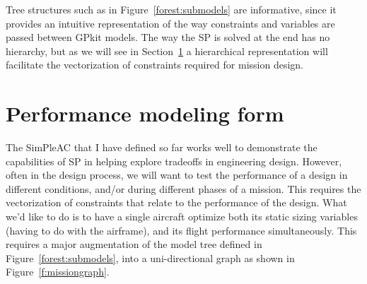 Tree structures such as in Figure~\ref{forest:submodels} are informative, since
it provides an intuitive representation of the way constraints and variables
are passed between GPkit models. The way the \gls{SP} is solved at the end has no
hierarchy, but as we will see in Section~\ref{s:mission} a hierarchical representation
will facilitate the vectorization of constraints required for mission design.


\section{Performance modeling form}
\label{s:mission}

The SimPleAC that I have defined so far works well to demonstrate the
capabilities of \gls{SP} in helping explore tradeoffs in engineering design.
However, often in the design process, we will want to test the performance of a
design in different conditions, and/or during different phases of a mission.
This requires the vectorization of
constraints that relate to the performance of the design. What we'd like to do
is to have a single aircraft optimize both its static sizing variables (having
to do with the airframe), and its flight performance simultaneously. This requires a major
augmentation of the model tree defined in Figure~\ref{forest:submodels}, into a
uni-directional graph as shown in Figure~\ref{f:missiongraph}.

